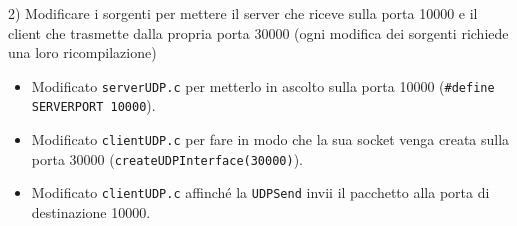 \documentclass[11pt]{article}
\begin{document}
\begin{tcolorbox}[colback=blue!5!white,colframe=blue!75!black,title=\textbf{DOMANDA}, breakable]
2) Modificare i sorgenti per mettere il server che riceve sulla porta 10000 e il client che trasmette dalla propria porta 30000 (ogni modifica dei sorgenti richiede una loro ricompilazione)
\end{tcolorbox}

\begin{tcolorbox}[colback=green!5!white,colframe=green!75!black,title=\textbf{RISPOSTA}, breakable]
\begin{itemize}
    \item Modificato \texttt{serverUDP.c} per metterlo in ascolto sulla porta 10000 (\texttt{\#define SERVERPORT 10000}).
    \item Modificato \texttt{clientUDP.c} per fare in modo che la sua socket venga creata sulla porta 30000 (\texttt{createUDPInterface(30000)}).
    \item Modificato \texttt{clientUDP.c} affinché la \texttt{UDPSend} invii il pacchetto alla porta di destinazione 10000.
\end{itemize}
\end{tcolorbox}
\end{document}
